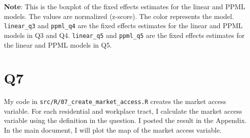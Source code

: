 \documentclass[
  11pt]{article}
\begin{document}
\footnotesize \textbf{Note}: This is the boxplot of the fixed effects
estimates for the linear and PPML models. The values are normalized
(z-score). The color represents the model. \texttt{linear\_q3} and
\texttt{ppml\_q4} are the fixed effects estimates for the linear and
PPML models in Q3 and Q4. \texttt{linear\_q5} and \texttt{ppml\_q5} are
the fixed effects estimates for the linear and PPML models in Q5.

\normalsize

\clearpage

\section*{Q7}\label{q7}

My code in \texttt{src/R/07\_create\_market\_access.R} creates the
market access variable. For each residential and workplace tract, I
calculate the market access variable using the definition in the
question. I posted the result in the Appendix. In the main document, I
will plot the map of the market access variable.
\end{document}
